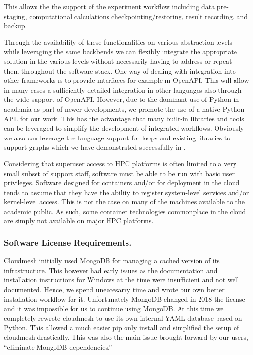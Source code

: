\documentclass[utf8]{FrontiersinVancouver} %
\begin{document}
This allows the the support of the experiment workflow including data pre-staging, computational calculations
checkpointing/restoring, result recording, and backup.

Through the availability of these functionalities on various abstraction levels while leveraging the same backbends we can flexibly integrate the appropriate solution in the various levels without necessarily having to address or repeat them throughout the software stack. One way of dealing with integration into other frameworks is to provide interfaces for example in OpenAPI. This will allow in many cases a sufficiently detailed integration in other languages also through the wide support of OpenAPI. However, due to the dominant use of Python in academia as part of newer developments, we promote the use of a native Python API. for our work. This has the advantage that many built-in libraries and tools can be leveraged to simplify the development of integrated workflows. Obviously we also can leverage the language support for loops and existing libraries to support graphs which we have demonstrated successfully in \citep{cloudmesh-cc}.

Considering that superuser access to HPC platforms is often limited to a very small subset of support staff, software must be able to be run with basic user privileges. Software designed for containers and/or for deployment in the cloud tends to assume that they have the ability to register system-level services and/or kernel-level access. This is not the case on many of the machines available to the academic public. As such, some container technologies commonplace in the cloud are simply not available on major HPC platforms.

\subsubsection{Software License Requirements.} 

Cloudmesh initially used MongoDB for managing a cached version of its infrastructure. This however had early issues as the documentation and installation instructions for Windows at the time were insufficient and not well documented. Hence, we spend uneccesarry time and wrote our own better installation workflow for it. Unfortunately MongoDB changed in 2018 the license and it was impossible for us to continue using MongoDB.  At this time we completely rewrote cloudmesh to use its own internal YAML database based on Python. This allowed 
a much easier pip only install and simplified the setup of cloudmesh drastically. This was also the main issue brought forward by our users, ``eliminate MongoDB dependencies.'' 
\end{document}
